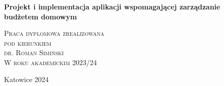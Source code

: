 \documentclass[a4paper, 10pt, twoside, openright]{report}
\newcommand{\customstyletitle}[1]{\Huge{\textbf{#1}}}
\newcommand{\HRule}{\rule{\linewidth}{0.5mm}} %
\begin{document}
\begin{large}
\begin{titlepage}
    \bigskip

	\begin{center}
	{\customstyletitle{Projekt i implementacja aplikacji wspomagającej zarządzanie budżetem domowym}}\\[0.4cm] 
    \end{center}
	
	\bigskip
    \begin{flushright}
        \textsc{Praca dyplomowa zrealizowana}\\[0cm]
        \textsc{pod kierunkiem}\\[0cm]
        \textsc{dr. Roman Simiński}\\[0cm]
        \textsc{W roku akademickim 2023/24}\\[0cm]
    \end{flushright}
 
	\vfill                  %
	\begin{center}
    {Katowice 2024}\\	    %
	\end{center}
\end{titlepage}

\renewcommand*\contentsname{Spis treści}
\tableofcontents                    %




\end{large}
\end{document}

